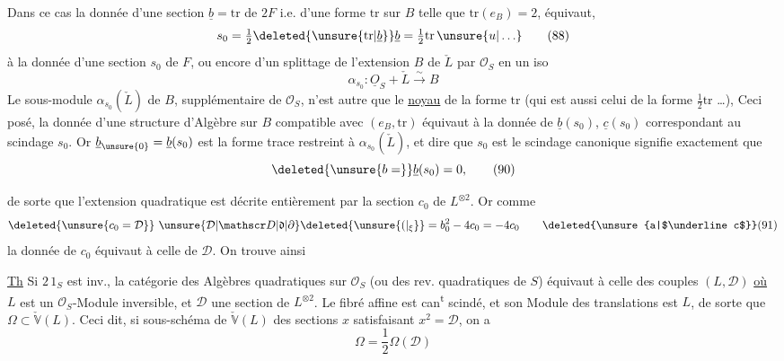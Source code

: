 Dans ce cas la donnée d'une section $\underline b=\mathrm{tr}$ de
$2F$ i.e. d'une forme $\mathrm{tr}$ sur $B$ telle que $\mathrm{tr}(e_B)=2$,
équivaut, 
\[
 s_0=\tfrac12\deleted{\unsure{\mathrm{tr}|\underline b}}\underline b=\tfrac12\mathrm{tr}\,\unsure{u|\ldots} \tag*{(88)}
\]
à la donnée d'une section  $s_0$ de $F$, ou encore
d'un splittage de l'extension $B$ de $\check L$ par $\mathcal O_S$ en
un iso
\[
\alpha_{s_0}:\underline O_S+\check L\xrightarrow{\sim}B \tag*{(89)}
\]
Le sous-module $\alpha_{s_0}(\check L)$ de $B$, supplémentaire
de $\mathcal O_S$, n'est autre que le \uline{noyau} de la
forme $\mathrm{tr}$ (qui est aussi celui de la forme
$\tfrac12\mathrm{tr}$ \ldots), 
Ceci posé, la donnée d'une
structure d'Algèbre sur $B$ compatible avec
$(e_B,\mathrm{tr})$ équivaut à la donnée de
$\underline b(s_0)$, $\underline c(s_0)$ correspondant au scindage $s_0$.
Or   $\underline b_{\unsure{0}}=\underline b(s_0)$ est la forme trace restreint à
$\alpha_{s_0}(\check L)$, et dire que  $s_0$ est le scindage canonique
signifie exactement que
\[
\deleted{\unsure{b=}}\underline b(s_0)=0,\tag*{(90)}
\]

de sorte que l'extension quadratique est décrite
entièrement par la section $c_0$ de $L^{\otimes2}$. Or comme
\[
\deleted{\unsure{c_0=\mathcal D}}\ \unsure{\mathcal D|\mathscr D|\mathfrak d|\partial}\deleted{\unsure{(|{}_{\xi}}}=b_0^2-4c_0=-4c_0\tag*{\deleted{\unsure{a|$\underline c$}}(91)}
\]
la donnée de $c_0$ équivaut à celle de $\mathcal D$. On
trouve ainsi

\uline{Th} Si $2\,1_S$ est inv., la catégorie des Algèbres
quadratiques sur $\mathcal O_S$ (ou  des rev. quadratiques
\inserted{$\Omega$} de $S$) équivaut à celle des couples $(L,\mathcal D)$
\uline{où} $L$ est un $\mathcal O_S$-Module inversible, et $\mathcal D$
une section de $L^{\otimes2}$.  Le fibré affine 
 est can\textsuperscript{t} scindé, et son Module des translations
est $L$, de sorte que $\Omega\subset\check{\mathbb V}(L)$\deleted{\unsure{)|$\xi$}}. Ceci
dit, si   sous-schéma de $\check{\mathbb V}(L)$
des sections $x$ satisfaisant $x^2=\mathcal D$, on a 
\[
\Omega=\frac12\Omega(\mathcal D)\tag*{(92)}
\]

